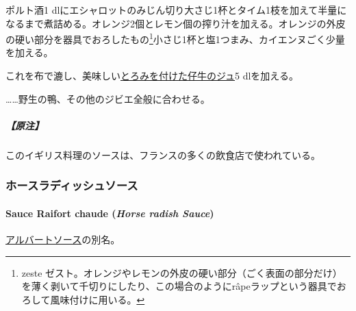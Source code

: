\begin{recette}
ポルト酒1\undemi{}
dlにエシャロットのみじん切り大さじ1杯とタイム1枝を加えて半量になるまで煮詰める。オレンジ2個とレモン\undemi{}個の搾り汁を加える。オレンジの外皮の硬い部分を器具でおろしたもの\footnote{zeste
  ゼスト。オレンジやレモンの外皮の硬い部分（ごく表面の部分だけ）を薄く剥いて千切りにしたり、この場合のようにrâpeラップという器具でおろして風味付けに用いる。}小さじ1杯と塩1つまみ、カイエンヌごく少量を加える。

これを布で漉し、美味しい\protect\hyperlink{jus-de-veau-lie}{とろみを付けた仔牛のジュ}5
dlを加える。

\ldots{}\ldots{}野生の鴨、その他のジビエ全般に合わせる。

\hypertarget{ux539fux6ce8-2}{%
\subparagraph{【原注】}\label{ux539fux6ce8-2}}

このイギリス料理のソースは、フランスの多くの飲食店で使われている。

\maeaki

\hypertarget{ux30dbux30fcux30b9ux30e9ux30c7ux30a3ux30c3ux30b7ux30e5ux30bdux30fcux30b9}{%
\subsubsection{ホースラディッシュソース}\label{ux30dbux30fcux30b9ux30e9ux30c7ux30a3ux30c3ux30b7ux30e5ux30bdux30fcux30b9}}

\hypertarget{horse-radish-sauce}{%
\paragraph{\texorpdfstring{Sauce Raifort chaude (\emph{Horse radish
Sauce})}{Sauce Raifort chaude (Horse radish Sauce)}}\label{horse-radish-sauce}}


\protect\hyperlink{albert-sauce}{アルバートソース}の別名。

\maeaki

\hypertarget{ux30eaux30d5ux30a9ux30fcux30e0ux30bdux30fcux30b948}{%
}
\end{recette}

